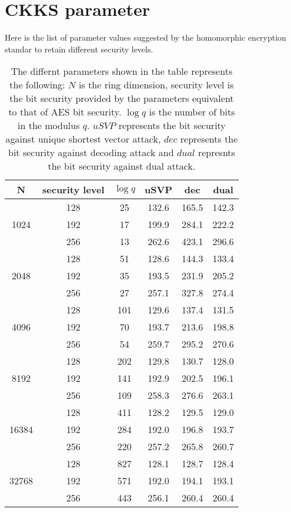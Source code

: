 \documentclass[a4paper,10pt]{article}
\begin{document}
\section{CKKS parameter} 

Here is the list of parameter values suggested by the homomorphic encryption standar to retain 
different security levels.




\begin{center}
\begin{table}[h]
\begin{tabular}{|c|c|c|c|c|c|}
\hline
N  &  security level & $\log q$ &  uSVP & dec & dual  \\
\hline
\multirow{3}{4em}{1024} & 128 & 25 & 132.6 & 165.5 & 142.3 \\
& 192 & 17 & 199.9 & 284.1 & 222.2 \\
& 256 & 13 & 262.6 & 423.1 & 296.6 \\
\hline
\multirow{3}{4em}{2048} & 128 & 51 & 128.6 & 144.3 & 133.4 	\\
& 192 & 35 & 193.5 & 231.9 & 205.2 \\
& 256 & 27 & 257.1 & 327.8 & 274.4 \\
\hline
\multirow{3}{4em}{4096} & 128 & 101 & 129.6 & 137.4 & 131.5  \\
& 192 & 70 & 193.7 & 213.6 & 198.8 \\
& 256 & 54 & 259.7 & 295.2 & 270.6 \\
\hline
\multirow{3}{4em}{8192} & 128 & 202 & 129.8 & 130.7 & 128.0\\
& 192 & 141 & 192.9 & 202.5 & 196.1\\
& 256 & 109 & 258.3 & 276.6 & 263.1\\
\hline
\multirow{3}{4em}{16384} & 128 & 411 & 128.2 & 129.5 & 129.0\\
& 192 & 284 & 192.0 & 196.8 & 193.7\\
& 256 & 220 & 257.2 & 265.8 & 260.7\\
\hline
\multirow{3}{4em}{32768} & 128 & 827 & 128.1 & 128.7 & 128.4\\
& 192 & 571 & 192.0 & 194.1 & 193.1\\
& 256 & 443 & 256.1 & 260.4 & 260.4\\
\hline

\end{tabular}
\caption{The differnt parameters shown in the table represents the following: $N$ is the ring dimension, security level is the bit security provided by the parameters equivalent to that of AES bit security. $\log q$ is the number of bits in the modulus $q$. $uSVP$ represents the bit security against unique shortest vector attack, $dec$ represents the bit security against decoding attack and $dual$ represnts the bit security against dual attack.}
\end{table}
\end{center}
\end{document}
